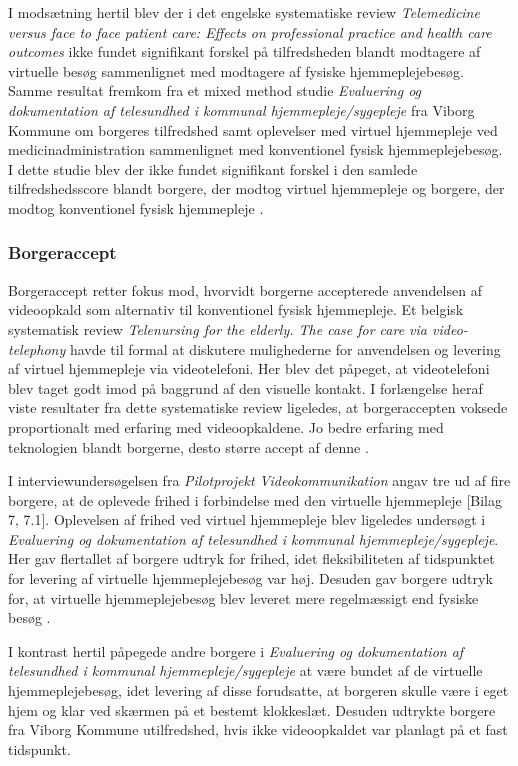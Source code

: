 I modsætning hertil blev der i det engelske systematiske review \textit{Telemedicine versus face to face patient care: Effects on professional practice and health care outcomes} ikke fundet signifikant forskel på tilfredsheden blandt modtagere af virtuelle besøg sammenlignet med modtagere af fysiske hjemmeplejebesøg\cite{Paf2}. 
\\Samme resultat fremkom fra et mixed method studie \textit{Evaluering og dokumentation af telesundhed i kommunal hjemmepleje/sygepleje} fra Viborg Kommune om borgeres tilfredshed samt oplevelser med virtuel hjemmepleje ved medicinadministration sammenlignet med konventionel fysisk hjemmeplejebesøg. I dette studie blev der ikke fundet signifikant forskel i den samlede tilfredshedsscore blandt borgere, der modtog virtuel hjemmepleje og borgere, der modtog konventionel fysisk hjemmepleje \cite{kandidat}.

\subsubsection{Borgeraccept}
Borgeraccept retter fokus mod, hvorvidt borgerne accepterede anvendelsen af videoopkald som alternativ til konventionel fysisk hjemmepleje. Et belgisk systematisk review \textit{Telenursing for the elderly. The case for care via video-telephony} havde til formal at diskutere mulighederne for anvendelsen og levering af virtuel hjemmepleje via videotelefoni. Her blev det påpeget, at videotelefoni blev taget godt imod på baggrund af den visuelle kontakt\cite{telenursing}. I forlængelse heraf viste resultater fra dette systematiske review ligeledes, at borgeraccepten voksede proportionalt med erfaring med videoopkaldene. Jo bedre erfaring med teknologien blandt borgerne, desto større accept af denne \cite{telenursing}.

I interviewundersøgelsen fra \textit{Pilotprojekt Videokommunikation} angav tre ud af fire borgere, at de oplevede frihed i forbindelse med den virtuelle hjemmepleje [Bilag 7, 7.1]. Oplevelsen af frihed ved virtuel hjemmepleje blev ligeledes undersøgt i \textit{Evaluering og dokumentation af telesundhed i kommunal hjemmepleje/sygepleje}. Her gav flertallet af borgere udtryk for frihed, idet fleksibiliteten af tidspunktet for levering af virtuelle hjemmeplejebesøg var høj. Desuden gav borgere udtryk for, at virtuelle hjemmeplejebesøg blev leveret mere regelmæssigt end fysiske besøg \cite{kandidat}.
 
I kontrast hertil påpegede andre borgere i \textit{Evaluering og dokumentation af telesundhed i kommunal hjemmepleje/sygepleje} at være bundet af de virtuelle hjemmeplejebesøg, idet levering af disse forudsatte, at borgeren skulle være i eget hjem og klar ved skærmen på et bestemt klokkeslæt. Desuden udtrykte borgere fra Viborg Kommune utilfredshed, hvis ikke videoopkaldet var planlagt på et fast tidspunkt\cite{kandidat}.
 
